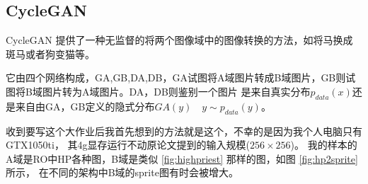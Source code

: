\documentclass[twocolumn,11pt]{ctexart}
\begin{document}
\subsection{CycleGAN}

CycleGAN \cite{zhu2017unpaired} 提供了一种无监督的将两个图像域中的图像转换的方法，如将马换成斑马或者狗变猫等。

它由四个网络构成，GA,GB,DA,DB，GA试图将A域图片转成B域图片，GB则试图将B域图片转为A域图片。DA，DB则鉴别一个图片
是来自真实分布$p_{data}(x)$还是来自由GA，GB定义的隐式分布$GA(y) \quad y \sim p_{data}(y)$。

收到要写这个大作业后我首先想到的方法就是这个，不幸的是因为我个人电脑只有GTX1050ti，
其4g显存运行不动原论文提到的输入规模($256\times256$)。
我的样本的A域是RO中HP各种图，B域是类似 \ref{fig:highpriest} 那样的图，如图 \ref{fig:hp2sprite} 所示，
在不同的架构中B域的sprite图有时会被增大。
\end{document}
